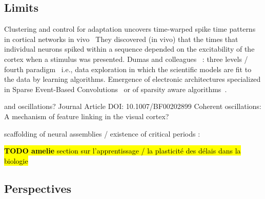 \documentclass[brainsci, %
               review,submit,pdftex,moreauthors%
               ]{Definitions/mdpi}
\newcommand{\note}[1]{{\sethlcolor{yellow}\hl{#1}}}
\begin{document}
\subsection{Limits}

Clustering and control for adaptation uncovers time-warped spike time patterns in cortical networks in vivo~\citep{Isbister} They discovered (in vivo) that the times that individual neurons spiked within a sequence depended on the excitability of the cortex when a stimulus was presented.
Dumas and colleagues~\citep{panahi_generative_2021} : three levels / fourth paradigm~\citep{tolle_fourth_2011} i.e., data exploration in which the scientific models are fit to the data by learning algorithms.
Emergence of electronic architectures specialized in Sparse Event-Based Convolutions~\citep{di_mauro_alfio_sne_2022} or of sparsity aware algorithms~\citep{yin_sata_2022}.

and oscillations? Journal Article DOI: 10.1007/BF00202899 Coherent oscillations: A mechanism of feature linking in the visual cortex?

scaffolding of neural assemblies / existence of critical periods :~\citep{dard_rapid_2021}



\note{\textbf{TODO amelie} section sur l'apprentissage / la plasticité des délais dans la biologie}

\subsection{Perspectives}
\end{document}
